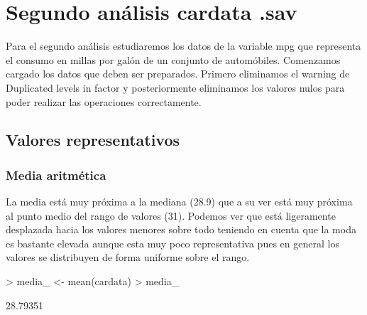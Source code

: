 \documentclass [a4paper] {article}
\begin{document}
\newpage
\section{Segundo análisis cardata .sav}

Para el segundo análisis estudiaremos los datos de la variable mpg que representa el consumo en millas por galón de un conjunto de automóbiles.
Comenzamos cargado los datos que deben ser preparados. 
Primero eliminamos el warning de Duplicated levels in factor y posteriormente eliminamos los valores nulos para poder realizar las operaciones correctamente.
\begin{Schunk}
\end{Schunk}

\subsection{Valores representativos}
\subsubsection{Media aritmética}
La media está muy próxima a la mediana (28.9) que a su ver está muy próxima al punto medio del rango de valores (31).
Podemos ver que está ligeramente desplazada hacia los valores menores sobre todo teniendo en cuenta que la moda es bastante elevada 
aunque esta muy poco representativa pues en general los valores se distribuyen de forma uniforme sobre el rango.
\begin{Schunk}
\begin{Sinput}
> media_ <- mean(cardata)
> media_
\end{Sinput}
\begin{Soutput}
[1] 28.79351
\end{Soutput}
\end{Schunk}
\end{document}
